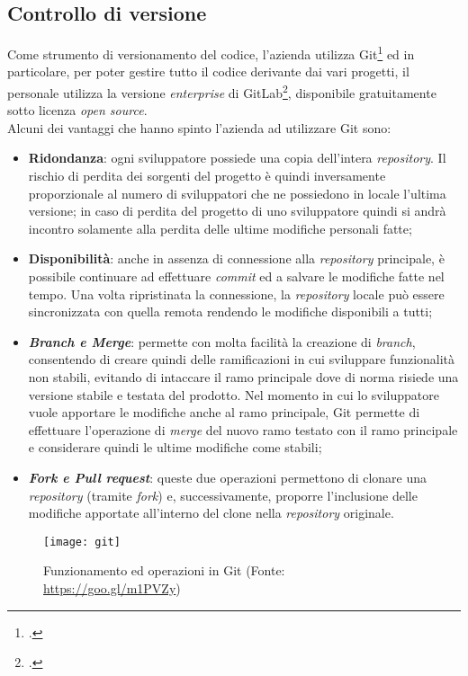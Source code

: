 \subsection{Controllo di versione}
Come strumento di versionamento del codice, l’azienda utilizza \gls{Git}\footcite{https://git-scm.com/} ed in particolare, per poter gestire tutto il codice derivante dai vari progetti, il personale utilizza la versione \textit{enterprise} di \gls{GitLab}\footcite{https://about.gitlab.com/}, disponibile gratuitamente sotto licenza \textit{open source}.\\
Alcuni dei vantaggi che hanno spinto l’azienda ad utilizzare Git sono:
\begin{itemize}
	\item \textbf{Ridondanza}: ogni sviluppatore possiede una copia dell’intera \textit{repository}. Il rischio di perdita dei sorgenti del progetto è quindi inversamente proporzionale al numero di sviluppatori che ne possiedono in locale l’ultima versione; in caso di perdita del progetto di uno sviluppatore quindi si andrà incontro solamente alla perdita delle ultime modifiche personali fatte;
	\item \textbf{Disponibilità}: anche in assenza di connessione alla \textit{repository} principale, è possibile continuare ad effettuare \textit{commit} ed a salvare le modifiche fatte nel tempo. Una volta ripristinata la connessione, la \textit{repository} locale può essere sincronizzata con quella remota rendendo le modifiche disponibili a tutti;
	\item \textit{\textbf{Branch e Merge}}: permette con molta facilità la creazione di \textit{branch}, consentendo di creare quindi delle ramificazioni in cui sviluppare funzionalità non stabili, evitando di intaccare il ramo principale dove di norma risiede una versione stabile e testata del prodotto. Nel momento in cui lo sviluppatore vuole apportare le modifiche anche al ramo principale, \gls{Git} permette di effettuare l’operazione di \textit{merge} del nuovo ramo testato con il ramo principale e considerare quindi le ultime modifiche come stabili;
	\item \textit{\textbf{Fork e Pull request}}: queste due operazioni permettono di clonare una \textit{repository} (tramite \textit{fork}) e, successivamente, proporre l’inclusione delle modifiche apportate all’interno del clone nella \textit{repository} originale.
\end{itemize}
\begin{figure}[!h] 
	\centering 
	\texttt{[image: git]} 
	\caption{Funzionamento ed operazioni in Git (Fonte: \href{https://goo.gl/m1PVZy}{https://goo.gl/m1PVZy})}
\end{figure}


